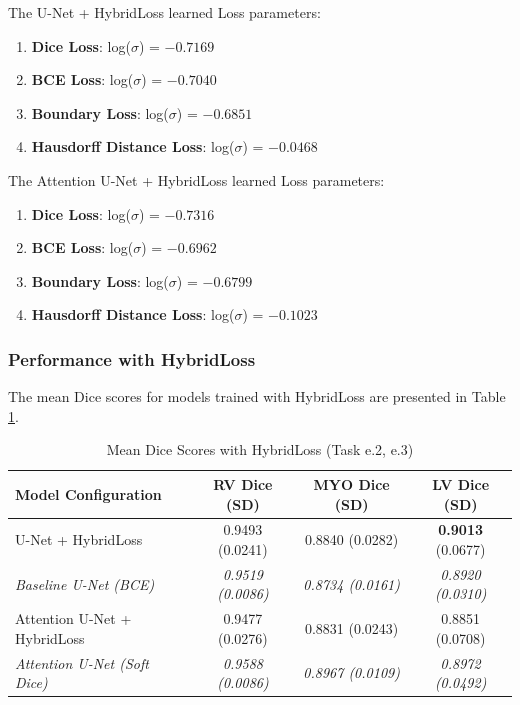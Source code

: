 \documentclass{article}
\begin{document}
The U-Net + HybridLoss learned Loss parameters:
\begin{enumerate}
  \item \textbf{Dice Loss}: log($\sigma$) = $-0.7169$
  \item \textbf{BCE Loss}: log($\sigma$) = $-0.7040$
  \item \textbf{Boundary Loss}: log($\sigma$) = $-0.6851$
  \item \textbf{Hausdorff Distance Loss}: log($\sigma$) = $-0.0468$
\end{enumerate}

The Attention U-Net + HybridLoss learned Loss parameters:
\begin{enumerate}
  \item \textbf{Dice Loss}: log($\sigma$) = $-0.7316$
  \item \textbf{BCE Loss}: log($\sigma$) = $-0.6962$
  \item \textbf{Boundary Loss}: log($\sigma$) = $-0.6799$
  \item \textbf{Hausdorff Distance Loss}: log($\sigma$) = $-0.1023$
\end{enumerate}
\subsubsection{Performance with HybridLoss}

The mean Dice scores for models trained with HybridLoss are presented in Table \ref{tab:hybridloss_results}.
\begin{table}[H]
  \centering
  \caption{Mean Dice Scores with HybridLoss (Task e.2, e.3)}
  \label{tab:hybridloss_results}
  \begin{tabular}{l|c|c|c}
    \toprule
    Model Configuration                  & RV Dice (SD)             & MYO Dice (SD)            & LV Dice (SD)             \\
    \midrule
    U-Net + HybridLoss                   & 0.9493 (0.0241)          & 0.8840 (0.0282)          & \textbf{0.9013} (0.0677) \\
    \textit{Baseline U-Net (BCE)}        & \textit{0.9519 (0.0086)} & \textit{0.8734 (0.0161)} & \textit{0.8920 (0.0310)} \\
    \midrule
    Attention U-Net + HybridLoss         & 0.9477 (0.0276)          & 0.8831 (0.0243)          & 0.8851 (0.0708)          \\
    \textit{Attention U-Net (Soft Dice)} & \textit{0.9588 (0.0086)} & \textit{0.8967 (0.0109)} & \textit{0.8972 (0.0492)} \\
    \bottomrule
  \end{tabular}
\end{table}
\end{document}

